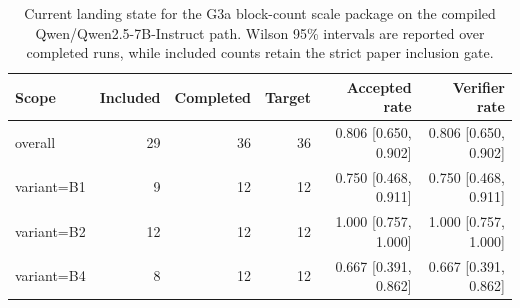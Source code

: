 \begin{table}[t]
\centering
\small
\begin{tabular}{lrrrrr}
\toprule
Scope & Included & Completed & Target & Accepted rate & Verifier rate \\
\midrule
overall & 29 & 36 & 36 & 0.806 [0.650, 0.902] & 0.806 [0.650, 0.902] \\
variant=B1 & 9 & 12 & 12 & 0.750 [0.468, 0.911] & 0.750 [0.468, 0.911] \\
variant=B2 & 12 & 12 & 12 & 1.000 [0.757, 1.000] & 1.000 [0.757, 1.000] \\
variant=B4 & 8 & 12 & 12 & 0.667 [0.391, 0.862] & 0.667 [0.391, 0.862] \\
\bottomrule
\end{tabular}
\caption{Current landing state for the G3a block-count scale package on the compiled Qwen/Qwen2.5-7B-Instruct path. Wilson 95\% intervals are reported over completed runs, while included counts retain the strict paper inclusion gate.}
\end{table}

